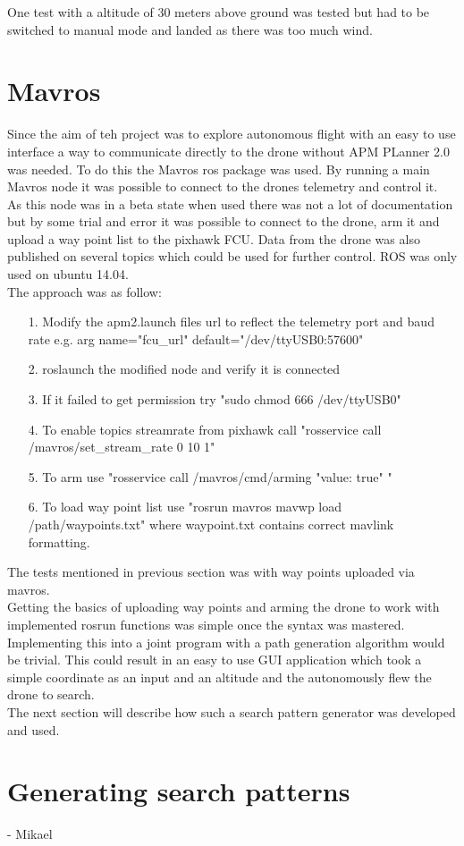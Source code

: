 One test with a altitude of 30 meters above ground was tested but had to be switched to manual mode and landed as there was too much wind.\\
 
\section{Mavros}
Since the aim of teh project was to explore autonomous flight with an easy to use interface a way to communicate directly to the drone without APM PLanner 2.0 was needed. To do this the Mavros \cite{Ref:Mavros} ros package was used. By running a main Mavros node it was possible to connect to the drones telemetry and control it.\\
As this node was in a beta state when used there was not a lot of documentation but by some trial and error it was possible to connect to the drone, arm it and upload a way point list to the pixhawk FCU. Data from the drone was also published on several topics which could be used for further control. ROS was only used on ubuntu 14.04.\\
The approach was as follow:

\begin{itemize}

\item[1.] Modify the apm2.launch files url to reflect the telemetry port and baud rate  e.g. arg name="fcu\_url" default="/dev/ttyUSB0:57600" 
\item[2.] roslaunch the modified node and verify it is connected
\item[3.] If it failed to get permission try "sudo chmod 666 /dev/ttyUSB0"
\item[4.] To enable topics streamrate from pixhawk call "rosservice call /mavros/set\_stream\_rate 0 10 1"
\item[5.] To arm use "rosservice call /mavros/cmd/arming "value: true" "
\item[6.] To load way point list use "rosrun mavros mavwp load /path/waypoints.txt" where waypoint.txt contains correct mavlink formatting.

\end{itemize}

The tests mentioned in previous section was with way points uploaded via mavros.\\
Getting the basics of uploading way points and arming the drone to work with implemented rosrun functions was simple once the syntax was mastered. Implementing this into a joint program with a path generation algorithm would be trivial. This could result in an easy to use GUI application which took a simple coordinate as an input and an altitude and the autonomously flew the drone to search.\\
The next section will describe how such a search pattern generator was developed and used.

\section{Generating search patterns}
- Mikael\\
\newpage